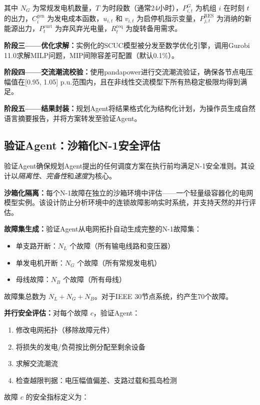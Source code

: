 \documentclass[conference]{IEEEtran}
\begin{document}
其中 $N_G$ 为常规发电机数量，$T$ 为时段数（通常24小时），$P_{i,t}^G$ 为机组 $i$ 在时刻 $t$ 的出力，$C_i^{\text{gen}}$ 为发电成本函数，$u_{i,t}$ 和 $v_{i,t}$ 为启停机指示变量，$P_{j,t}^{\text{RES}}$ 为消纳的新能源出力，$P_t^{\text{curt}}$ 为弃风弃光电量，$R_t^{\text{req}}$ 为旋转备用需求。

\textbf{阶段三——优化求解：}实例化的SCUC模型被分发至数学优化引擎，调用Gurobi 11.0求解MILP问题，MIP间隙容差可配置（默认0.1\%）。

\textbf{阶段四——交流潮流校验：}使用pandapower进行交流潮流验证，确保各节点电压幅值在[0.95, 1.05] p.u.范围内，且在非线性交流模型下所有热稳定极限均得到满足。

\textbf{阶段五——结果封装：}规划Agent将结果格式化为结构化计划，为操作员生成自然语言摘要报告，并将方案转发至验证Agent。

\subsection{验证Agent：沙箱化N-1安全评估}

验证Agent确保规划Agent提出的任何调度方案在执行前均满足N-1安全准则。其设计以\textit{隔离性}、\textit{完备性}和\textit{速度}为核心。

\textbf{沙箱化隔离：}每个N-1故障在独立的沙箱环境中评估——一个轻量级容器化的电网模型实例。该设计防止分析环境中的连锁故障影响实时系统，并支持天然的并行评估。

\textbf{故障集生成：}验证Agent从电网拓扑自动生成完整的N-1故障集：
\begin{itemize}
    \item 单支路开断：$N_L$ 个故障（所有输电线路和变压器）
    \item 单发电机开断：$N_G$ 个故障（所有常规发电机）
    \item 母线故障：$N_B$ 个故障（所有母线）
\end{itemize}
故障集总数为 $N_L + N_G + N_B$。对于IEEE 30节点系统，约产生70个故障。

\textbf{并行安全评估：}对每个故障 $c$，验证Agent：
\begin{enumerate}
    \item 修改电网拓扑（移除故障元件）
    \item 将损失的发电/负荷按比例分配至剩余设备
    \item 求解交流潮流
    \item 检查越限判据：电压幅值偏差、支路过载和孤岛检测
\end{enumerate}

故障 $c$ 的安全指标定义为：
\end{document}
